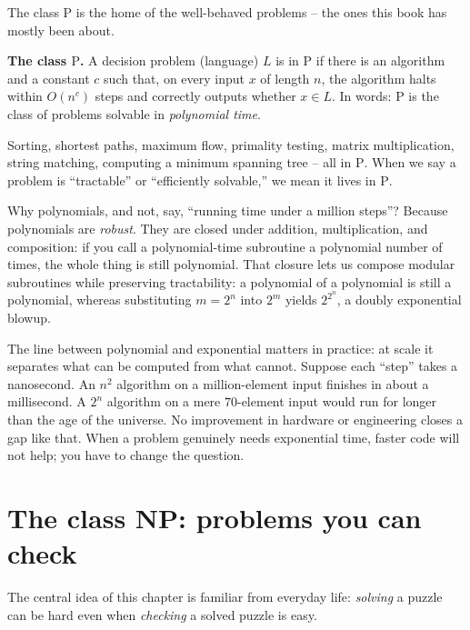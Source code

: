 The class $\mathrm{P}$ is the home of the well-behaved problems -- the ones this
book has mostly been about.

\begin{formalbox}
\textbf{The class $\mathrm{P}$.} A decision problem (language) $L$ is in
$\mathrm{P}$ if there is an algorithm and a constant $c$ such that, on every input
$x$ of length $n$, the algorithm halts within $O(n^c)$ steps and correctly
outputs whether $x \in L$. In words: $\mathrm{P}$ is the class of problems
solvable in \emph{polynomial time}.
\end{formalbox}

Sorting, shortest paths, maximum flow, primality testing, matrix multiplication,
string matching, computing a minimum spanning tree -- all in $\mathrm{P}$. When we
say a problem is ``tractable'' or ``efficiently solvable,'' we mean it lives in
$\mathrm{P}$.

Why polynomials, and not, say, ``running time under a million steps''? Because
polynomials are \emph{robust}. They are closed under addition, multiplication,
and composition: if you call a polynomial-time subroutine a polynomial number of
times, the whole thing is still polynomial. That closure lets us compose modular
subroutines while preserving tractability: a polynomial of a polynomial is still
a polynomial, whereas substituting $m = 2^n$ into $2^m$ yields $2^{2^n}$, a
doubly exponential blowup.

\begin{aestheticbox}
The line between polynomial and exponential matters in practice: at scale it
separates what can be computed from what cannot. Suppose
each ``step'' takes a nanosecond. An $n^2$ algorithm on a million-element input
finishes in about a millisecond. A $2^n$ algorithm on a mere $70$-element input
would run for longer than the age of the universe. No improvement in hardware
or engineering closes a gap like that. When a problem genuinely needs
exponential time, faster code will not help; you have to change the question.
\end{aestheticbox}

\section{The class NP: problems you can check}

The central idea of this chapter is familiar from everyday life: \emph{solving}
a puzzle can be hard even when \emph{checking} a solved puzzle is easy.

